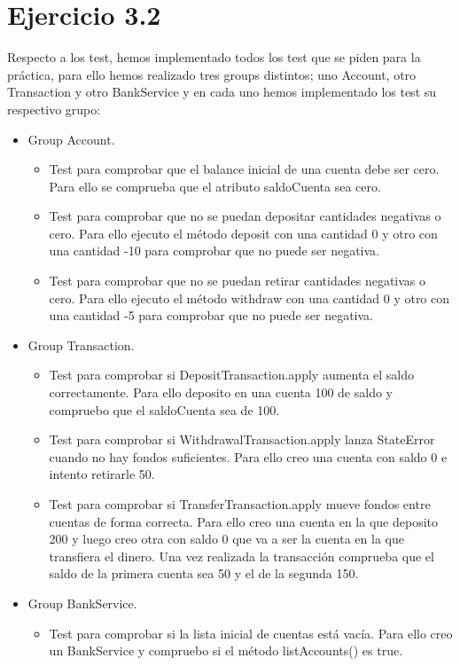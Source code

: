 \documentclass[12pt]{article}
\begin{document}
\section*{Ejercicio 3.2}
Respecto a los test, hemos implementado todos los test que se piden para la práctica, para ello hemos realizado tres groups distintos; uno Account, otro Transaction y otro BankService y en cada uno hemos implementado los test su respectivo grupo:
\begin{itemize}
    \item Group Account.
          \begin{itemize}
              \item Test para comprobar que el balance inicial de una cuenta debe ser cero. Para ello se comprueba que el atributo saldoCuenta sea cero.
              \item Test para comprobar que no se puedan depositar cantidades negativas o cero. Para ello ejecuto el método deposit con una cantidad 0 y otro con una cantidad -10 para comprobar que no puede ser negativa.
              \item Test para comprobar que no se puedan retirar cantidades negativas o cero. Para ello ejecuto el método withdraw con una cantidad 0 y otro con una cantidad -5 para comprobar que no puede ser negativa.
          \end{itemize}
    \item Group Transaction.
          \begin{itemize}
              \item Test para comprobar si DepositTransaction.apply aumenta el saldo correctamente. Para ello deposito en una cuenta 100 de saldo y compruebo que el saldoCuenta sea de 100.
              \item Test para comprobar si WithdrawalTransaction.apply lanza StateError cuando no hay fondos suficientes. Para ello creo una cuenta con saldo 0 e intento retirarle 50.
              \item Test para comprobar si TransferTransaction.apply mueve fondos entre cuentas de forma correcta. Para ello creo una cuenta en la que deposito 200 y luego creo otra con saldo 0 que va a ser la cuenta en la que transfiera el dinero. Una vez realizada la transacción comprueba que el saldo de la primera cuenta sea 50 y el de la segunda 150.
          \end{itemize}
    \item Group BankService.
          \begin{itemize}
              \item Test para comprobar si la lista inicial de cuentas está vacía. Para ello creo un BankService y compruebo si el método listAccounts() es true.

\end{itemize}
\end{itemize}
\end{document}
